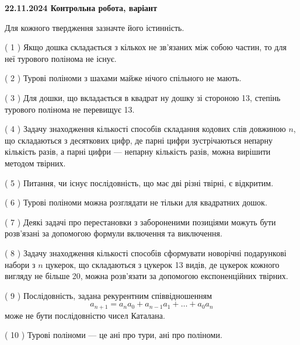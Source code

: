 \documentclass[12pt, ukrainian]{article}
\begin{document}
\vspace{4mm}
\newpage
\begin {large}

\textbf{22.11.2024 Контрольна робота, варіант  }\par


{
Для кожного твердження зазначте його істинність.\par
\vspace{2mm}
( 1 ) Якщо дошка складається з кількох не зв’язаних між собою частин, то для неї турового полінома не існує.%

( 2 ) Турові поліноми з шахами майже нічого спільного не мають.%

( 3 ) Для дошки, що вкладається в квадрат ну дошку зі стороною 13, степінь турового полінома не перевищує 13.%

( 4 ) Задачу знаходження кількості способів складання кодових слів довжиною $n$, що складаються з десяткових цифр, де парні цифри зустрічаються непарну кількість разів, а парні цифри — непарну кількість разів, можна вирішити методом твірних.%

( 5 ) Питання, чи існує послідовність, що має дві різні твірні, є відкритим.%

( 6 ) Турові поліноми можна розглядати не тільки для квадратних дошок.%

( 7 ) Деякі задачі про перестановки з забороненими позиціями можуть бути розв’я\-за\-ні за допомогою формули включення та виключення.%

( 8 ) Задачу знаходження кількості способів сформувати новорічні подарункові набори з $n$ цукерок, що складаються з цукерок 13 видів, де цукерок кожного вигляду не більше 20, можна розв’язати за допомогою експоненційних твірних.%

( 9 ) Послідовність, задана рекурентним співвідношенням $$a_{n+1}=a_{n}a_{0}+a_{n-1}a_{1}+\ldots+a_0a_{n}$$ може не бути послідовністю чисел Каталана.%

( 10 ) Турові поліноми --- це ані про тури, ані про поліноми.%


\vspace{5mm}
}
\end {large}
\end{document}
